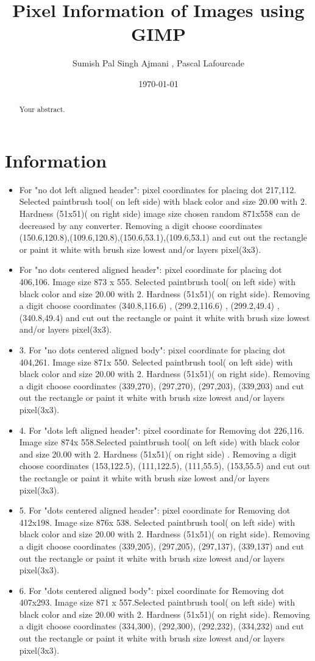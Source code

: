\documentclass[a4paper]{article}
\title{Pixel Information of Images  using GIMP}
\author{Sumish Pal Singh Ajmani , Pascal Lafourcade}
\date{\today}
\begin{document}
\maketitle

\begin{abstract}
Your abstract.
\end{abstract}

\section{Information}

\begin{itemize}
\item For "no dot left aligned header": pixel coordinates for placing dot 217,112. Selected paintbrush tool( on left side) with black color and size 20.00 with 2. Hardness (51x51)( on right side)  image size chosen random 871x558 can de decreased by any converter. Removing a digit choose coordinates (150.6,120.8),(109.6,120.8),(150.6,53.1),(109.6,53.1) and cut out the rectangle or paint it white with brush size 	lowest and/or layers pixel(3x3).
\item For "no dots centered aligned header": pixel coordinate for placing dot 406,106. Image size 873 x 555. Selected paintbrush tool( on left side) with black color and size 20.00 with 2. Hardness (51x51)( on right  side). Removing a digit choose coordinates (340.8,116.6) , (299.2,116.6) , (299.2,49.4) , (340.8,49.4) and cut out the rectangle or paint it white with brush size lowest and/or layers pixel(3x3).
\item 3. For "no dots centered aligned body": pixel coordinate for placing dot 404,261. Image size 871x 550. Selected paintbrush tool( on left side) with black color and size 20.00 with 2. Hardness (51x51)( on right side). Removing a digit choose coordinates (339,270),  (297,270), (297,203), (339,203) and cut out the rectangle or paint it white with brush size lowest and/or layers pixel(3x3).
\item 4. For "dots left aligned header": pixel coordinate for Removing dot 226,116. Image size 874x 558.Selected paintbrush tool( on left side) with black color and size 20.00 with 2. Hardness (51x51)( on right side) . Removing a digit choose coordinates (153,122.5), (111,122.5), (111,55.5), (153,55.5) and cut out the rectangle or paint it white with brush size lowest and/or layers pixel(3x3).
\item 5. For "dots centered aligned header": pixel coordinate for Removing dot 412x198. Image size 876x 538. Selected paintbrush tool( on left side) with black color and size 20.00 with 2. Hardness (51x51)( on right side). Removing a digit choose coordinates (339,205), (297,205), (297,137), (339,137) and cut out the rectangle or paint it white with brush size  lowest and/or layers pixel(3x3).
\item 6. For "dots centered aligned body": pixel coordinate for Removing dot 407x293. Image size 871 x 557.Selected paintbrush tool( on left side) with black color and size 20.00 with 2. Hardness (51x51)( on right side). Removing a digit choose coordinates (334,300), (292,300), (292,232), (334,232) and cut out the rectangle or paint it white with brush size lowest and/or layers pixel(3x3).


\end{itemize}
\end{document}
